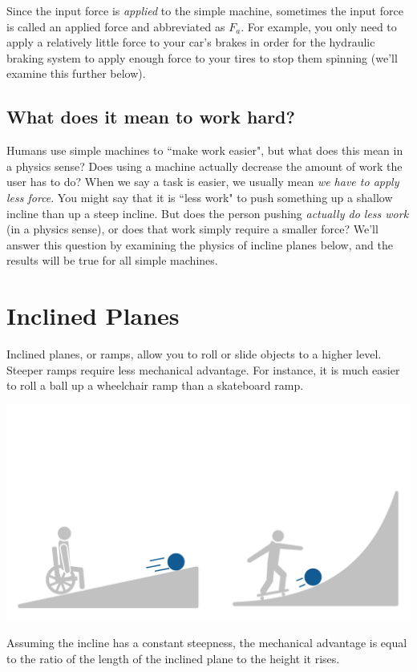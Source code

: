 Since the input force is \textit{applied} to the simple machine, sometimes the 
input force is called an applied force and abbreviated as $F_a$. For example, 
you only need to apply a relatively little force to your car's brakes in order 
for the hydraulic braking system to apply enough force to your tires to stop 
them spinning (we'll examine this further below). 

\subsection{What does it mean to work hard?}
Humans use simple machines to ``make work easier", but what does this mean in a 
physics sense? Does using a machine actually decrease the amount of work the 
user has to do? When we say a task is easier, we usually mean \textit{we have to 
apply less force}. You might say that it is ``less work" to push something up a 
shallow incline than up a steep incline. But does the person pushing \textit{
actually do less work} (in a physics sense), or does that work simply require 
a smaller force? We'll answer this question by examining the physics of incline 
planes below, and the results will be true for all simple machines. 

\section{Inclined Planes}

Inclined planes, or ramps, allow you to roll or slide objects to a higher 
level. Steeper ramps require less mechanical advantage. For instance, it is much 
easier to roll a ball up a wheelchair ramp than a skateboard ramp.

\includegraphics[width=\textwidth]{rampcomparison.png}

Assuming the incline has a constant steepness, the mechanical advantage is 
equal to the ratio of the length of the inclined plane to the height it rises. 

